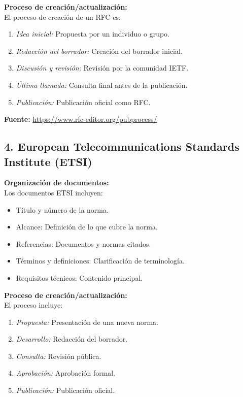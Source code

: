 \documentclass[12pt]{report}
\begin{document}
\textbf{Proceso de creación/actualización:} \\
El proceso de creación de un RFC es:
\begin{enumerate}
	\item \textit{Idea inicial:} Propuesta por un individuo o grupo.
	\item \textit{Redacción del borrador:} Creación del borrador inicial.
	\item \textit{Discusión y revisión:} Revisión por la comunidad IETF.
	\item \textit{Última llamada:} Consulta final antes de la publicación.
	\item \textit{Publicación:} Publicación oficial como RFC.
\end{enumerate}

\textbf{Fuente:} \url{https://www.rfc-editor.org/pubprocess/}

\subsection*{4. European Telecommunications Standards Institute (ETSI)}

\textbf{Organización de documentos:} \\
Los documentos ETSI incluyen:
\begin{itemize}
	\item Título y número de la norma.
	\item Alcance: Definición de lo que cubre la norma.
	\item Referencias: Documentos y normas citados.
	\item Términos y definiciones: Clarificación de terminología.
	\item Requisitos técnicos: Contenido principal.
\end{itemize}

\textbf{Proceso de creación/actualización:} \\
El proceso incluye:
\begin{enumerate}
	\item \textit{Propuesta:} Presentación de una nueva norma.
	\item \textit{Desarrollo:} Redacción del borrador.
	\item \textit{Consulta:} Revisión pública.
	\item \textit{Aprobación:} Aprobación formal.
	\item \textit{Publicación:} Publicación oficial.
\end{enumerate}
\end{document}
